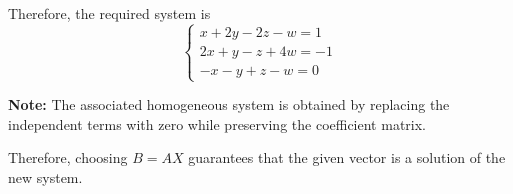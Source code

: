 \begin{answer}
    Therefore, the required system is
    $$
    \boxed{
    \begin{cases}
    x+2y-2z-w=1\\
    2x+y-z+4w=-1\\
    -x-y+z-w=0
    \end{cases}
    }
    $$

    {\color{red}
    \textbf{Note:} The associated homogeneous system is obtained by replacing the
    independent terms with zero while preserving the coefficient matrix.

    Therefore, choosing $B=AX$ guarantees that the given vector is a solution
    of the new system.}
\end{answer}
